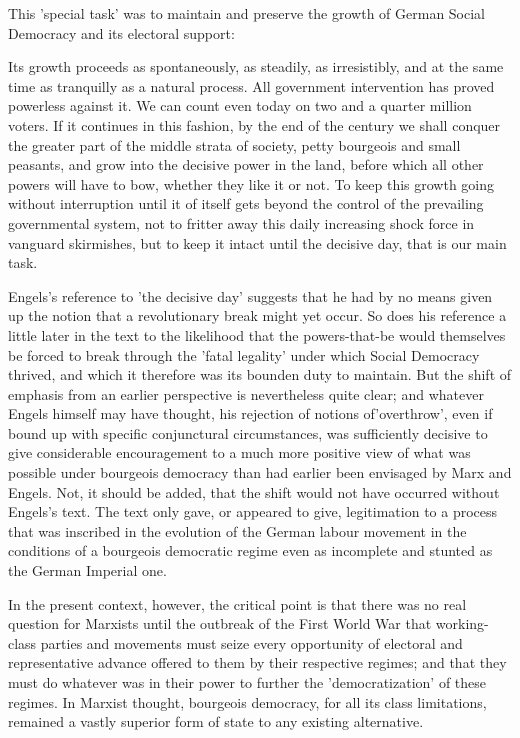 This 'special task' was to maintain and preserve the growth of German Social Democracy and its electoral support:
\begin{displayquote}
    Its growth proceeds as spontaneously, as steadily, as irresistibly, and at the same time as tranquilly as a natural process. All government intervention has proved powerless against it. We can count even today on two and a quarter million voters. If it continues in this fashion, by the end of the century we shall conquer the greater part of the middle strata of society, petty bourgeois and small peasants, and grow into the decisive power in the land, before which all other powers will have to bow, whether they like it or not. To keep this growth going without interruption until it of itself gets beyond the control of the prevailing governmental system, not to fritter away this daily increasing shock force in vanguard skirmishes, but to keep it intact until the decisive day, that is our main task.
\end{displayquote}

Engels's reference to 'the decisive day' suggests that he had by no means given up the notion that a revolutionary break might yet occur. So does his reference a little later in the text to the likelihood that the powers-that-be would themselves be forced to break through the 'fatal legality' under which Social Democracy thrived, and which it therefore was its bounden duty to maintain. But the shift of emphasis from an earlier perspective is nevertheless quite clear; and whatever Engels himself may have thought, his rejection of notions of'overthrow', even if bound up with specific conjunctural circumstances, was sufficiently decisive to give considerable encouragement to a much more positive view of what was possible under bourgeois democracy than had earlier been envisaged by Marx and Engels. Not, it should be added, that the shift would not have occurred without Engels's text. The text only gave, or appeared to give, legitimation to a process that was inscribed in the evolution of the German labour movement in the conditions of a bourgeois democratic regime even as incomplete and stunted as the German Imperial one.

 In the present context, however, the critical point is that there was no real question for Marxists until the outbreak of the First World War that working-class parties and movements must seize every opportunity of electoral and representative advance offered to them by their respective regimes; and that they must do whatever was in their power to further the 'democratization' of these regimes. In Marxist thought, bourgeois democracy, for all its class limitations, remained a vastly superior form of state to any existing alternative.

